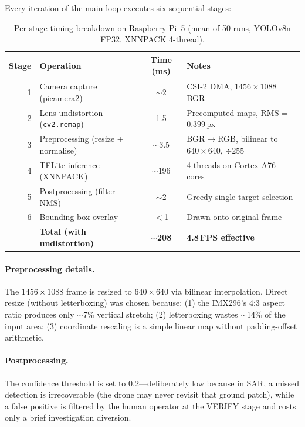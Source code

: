 \documentclass[10pt,a4paper]{article}
\begin{document}
Every iteration of the main loop executes six sequential stages:

\begin{table}[ht]
  \centering
  \caption{Per-stage timing breakdown on Raspberry Pi~5 (mean of 50 runs, YOLOv8n FP32, XNNPACK 4-thread).}\label{tab:pipeline-timing}
  \begin{tabular}{@{}r l c l@{}}
    \toprule
    \textbf{Stage} & \textbf{Operation} & \textbf{Time (ms)} & \textbf{Notes} \\
    \midrule
    1 & Camera capture (picamera2) & ${\sim}$2 & CSI-2 DMA, $1456 \times 1088$ BGR \\
    2 & Lens undistortion (\texttt{cv2.remap}) & 1.5 & Precomputed maps, RMS = 0.399\,px \\
    3 & Preprocessing (resize + normalise) & ${\sim}$3.5 & BGR$\to$RGB, bilinear to $640 \times 640$, $\div 255$ \\
    4 & TFLite inference (XNNPACK) & ${\sim}$196 & 4 threads on Cortex-A76 cores \\
    5 & Postprocessing (filter + NMS) & ${\sim}$2 & Greedy single-target selection \\
    6 & Bounding box overlay & $<$1 & Drawn onto original frame \\
    \midrule
    & \textbf{Total (with undistortion)} & \textbf{${\sim}$208} & \textbf{4.8\,FPS effective} \\
    \bottomrule
  \end{tabular}
\end{table}

\paragraph{Preprocessing details.}
The $1456 \times 1088$ frame is resized to $640 \times 640$ via bilinear interpolation. Direct resize (without letterboxing) was chosen because: (1) the IMX296's 4:3 aspect ratio produces only ${\sim}$7\% vertical stretch; (2) letterboxing wastes ${\sim}$14\% of the input area; (3) coordinate rescaling is a simple linear map without padding-offset arithmetic.

\paragraph{Postprocessing.}
The confidence threshold is set to 0.2---deliberately low because in SAR, a missed detection is irrecoverable (the drone may never revisit that ground patch), while a false positive is filtered by the human operator at the VERIFY stage and costs only a brief investigation diversion.
\end{document}
